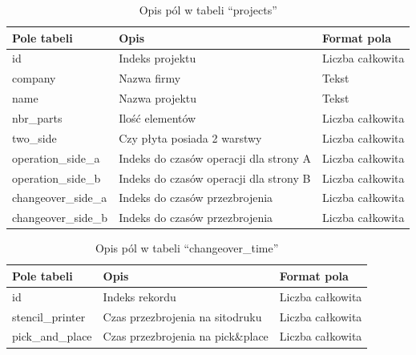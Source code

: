 \begin{table}[H]
	\centering
	\caption{Opis pól w tabeli ``projects''}
	\begin{tabular}{lll}
		\toprule
		Pole tabeli         & Opis                                    & Format pola       \\
		\midrule
		id                  & Indeks projektu                         & Liczba całkowita \\
		company             & Nazwa firmy                             & Tekst             \\
		name                & Nazwa projektu                          & Tekst             \\
		nbr\_parts          & Ilość elementów                      & Liczba całkowita \\
		two\_side           & Czy płyta posiada 2 warstwy            & Liczba całkowita \\
		operation\_side\_a  & Indeks do czasów operacji dla strony A & Liczba całkowita \\
		operation\_side\_b  & Indeks do czasów operacji dla strony B & Liczba całkowita \\
		changeover\_side\_a & Indeks do czasów przezbrojenia         & Liczba całkowita \\
		changeover\_side\_b & Indeks do czasów przezbrojenia         & Liczba całkowita \\
		\bottomrule
	\end{tabular}
	\label{projects}
\end{table}

\begin{table}[H]
	\centering
	\caption{Opis pól w tabeli ``changeover\_time''}
	\begin{tabular}{lll}
		\toprule
		Pole tabeli      & Opis                              & Format pola       \\
		\midrule
		id               & Indeks rekordu                    & Liczba całkowita \\
		stencil\_printer & Czas przezbrojenia na sitodruku   & Liczba całkowita \\
		pick\_and\_place & Czas przezbrojenia na pick\&place & Liczba całkowita \\
		\bottomrule
	\end{tabular}
	\label{changeover}
\end{table}

